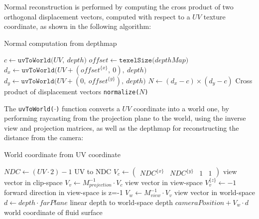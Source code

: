 \noindent
Normal reconstruction is performed by computing the cross product of two orthogonal displacement vectors, computed with respect to a $UV$ texture coordinate, as shown in the following algorithm:
\begin{algorithm}[H]
\caption{Normal computation from depthmap}\label{algo:normals}
\begin{algorithmic}[1]
        \State $c \gets \texttt{uvToWorld($UV,\ depth$)}$
        \State $offset \gets \texttt{texelSize($depthMap$)}$
        \State $d_x \gets \texttt{uvToWorld($UV + (offset^{\{x\}},\ 0),\ depth$)}$
        \State $d_y \gets \texttt{uvToWorld($UV + (0,\ offset^{\{y\}}),\ depth$)}$
        \State $N \gets (d_x - c) \times (d_y-c)$                                   \Comment Cross product of displacement vectors 
        \State \Return \texttt{normalize($N$)}
    \EndFunction
\end{algorithmic}
\end{algorithm}

\noindent
The \texttt{uvToWorld($\cdot$)} function converts a $UV$ coordinate into a world one, by performing raycasting from the projection plane to the world, using the inverse view and projection matrices, as well as the depthmap for reconstructing the distance from the camera:

\begin{algorithm}[H]
\caption{World coordinate from UV coordinate}\label{algo:uvToWorld}
\begin{algorithmic}[1]
        \State $NDC \gets (UV \cdot 2) - 1$                                         \Comment UV to NDC
        \State $V_c \gets \begin{pmatrix} NDC^{\{x\}} & NDC^{\{y\}} & 1 & 1  \end{pmatrix}$     \Comment view vector in clip-space  
        \State $V_v \gets M_{projection}^{-1} \cdot V_c$                            \Comment view vector in view-space
        \State $V_{v}^{\{z\}} \gets-1$                                              \Comment forward direction in view-space is z=-1
        \State $V_w \gets M_{view}^{-1}\cdot V_v$                                   \Comment view vector in world-space
        \State $d \gets depth \cdot farPlane$                                       \Comment [0,1] linear depth to world-space depth
        \State \Return $cameraPosition + V_w \cdot d$                               \Comment world coordinate of fluid surface
    \EndFunction
\end{algorithmic}
\end{algorithm}

